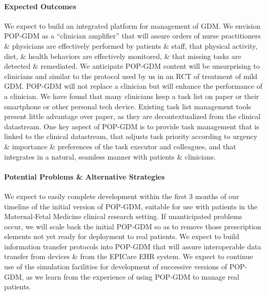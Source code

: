 \paragraph{Expected Outcomes} We expect to build an integrated
platform for management of GDM. We envision POP-GDM as a ``clinician
amplifier'' that will assure orders of nurse practitioners \&
physicians are effectively performed by patients \& staff, that
physical activity, diet, \& health behaviors are effectively
monitored, \& that missing tasks are detected \& remediated. We
anticipate POP-GDM content will be unsurprising to clinicians and
similar to the protocol used by us in an RCT of treatment of mild
GDM. POP-GDM will not replace a clinician but will enhance the
performance of a clinician. We have found that many clinicians keep a
task list on paper or their smartphone or other personal tech
device. Existing task list management tools present little advantage
over paper, as they are decontextualized from the clinical
datastream. One key aspect of POP-GDM is to provide task management
that is linked to the clinical datastream, that adjusts task priority
according to urgency \& importance \& preferences of the task executor
and colleagues, and that integrates in a natural, seamless manner with
patients \& clinicians.

\paragraph{Potential Problems \& Alternative Strategies} We expect to
easily complete development within the first 3 months of our timeline
of the initial version of POP-GDM, suitable for use with patients in
the Maternal-Fetal Medicine clinical research setting. If
unanticipated problems occur, we will scale back the initial POP-GDM
so as to remove those prescription elements not yet ready for
deployment to real patients. We expect to build information transfer
protocols into POP-GDM that will assure interoperable data transfer
from devices \& from the EPICare EHR system. We expect to continue use
of the simulation facilities for development of successive versions of
POP-GDM, as we learn from the experience of using POP-GDM to manage
real patients.

